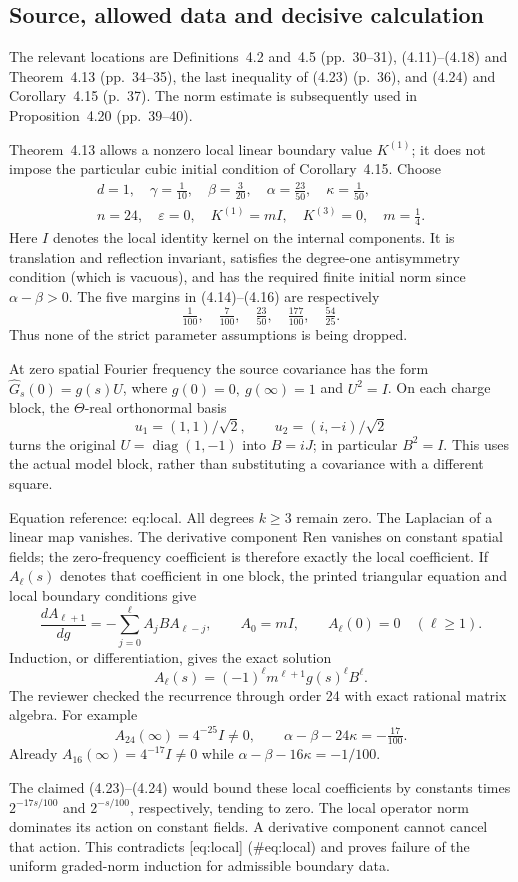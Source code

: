 \documentclass[10pt]{article}
\begin{document}
\subsection*{Source, allowed data and decisive calculation}
The relevant locations are Definitions 4.2 and 4.5 (pp. 30–31), (4.11)–(4.18) and Theorem 4.13 (pp. 34–35), the last inequality of (4.23) (p. 36), and (4.24) and Corollary 4.15 (p. 37). The norm estimate is subsequently used in Proposition 4.20 (pp. 39–40).\par
Theorem 4.13 allows a nonzero local linear boundary value \(K^{(1)}\); it does not impose the particular cubic initial condition of Corollary 4.15. Choose \[\begin{gathered}
 d=1,\quad \gamma=\tfrac1{10},\quad \beta=\tfrac3{20},\quad
 \alpha=\tfrac{23}{50},\quad \kappa=\tfrac1{50},\\
 n=24,\quad \varepsilon=0,\quad K^{(1)}=mI,\quad K^{(3)}=0,
 \quad m=\tfrac14 .
 \end{gathered}\] Here \(I\) denotes the local identity kernel on the internal components. It is translation and reflection invariant, satisfies the degree-one antisymmetry condition (which is vacuous), and has the required finite initial norm since \(\alpha-\beta>0\). The five margins in (4.14)–(4.16) are respectively \[\tfrac1{100},\quad\tfrac7{100},\quad\tfrac{23}{50},
 \quad\tfrac{177}{100},\quad\tfrac{54}{25}.\] Thus none of the strict parameter assumptions is being dropped.\par
At zero spatial Fourier frequency the source covariance has the form \(\widehat G_s(0)=g(s)U\), where \(g(0)=0,\ g(\infty)=1\) and \(U^2=I\). On each charge block, the \(\Theta\)-real orthonormal basis \[u_1=(1,1)/\sqrt2,\qquad u_2=(i,-i)/\sqrt2\] turns the original \(U=\operatorname{diag}(1,-1)\) into \(B=iJ\); in particular \(B^2=I\). This uses the actual model block, rather than substituting a covariance with a different square.\par
Equation reference: eq:local. All degrees \(k\geq3\) remain zero. The Laplacian of a linear map vanishes. The derivative component \(\mathrm{Ren}\) vanishes on constant spatial fields; the zero-frequency coefficient is therefore exactly the local coefficient. If \(A_\ell(s)\) denotes that coefficient in one block, the printed triangular equation and local boundary conditions give \[\frac{d A_{\ell+1}}{dg}
       =-\sum_{j=0}^{\ell}A_jBA_{\ell-j},\qquad
 A_0=mI,\qquad A_\ell(0)=0\quad(\ell\geq1).\] Induction, or differentiation, gives the exact solution \[A_\ell(s)=(-1)^\ell m^{\ell+1}g(s)^\ell B^\ell.   \] The reviewer checked the recurrence through order 24 with exact rational matrix algebra. For example \[A_{24}(\infty)=4^{-25}I\ne0,\qquad
 \alpha-\beta-24\kappa=-\tfrac{17}{100}.\] Already \(A_{16}(\infty)=4^{-17}I\ne0\) while \(\alpha-\beta-16\kappa=-1/100\).\par
The claimed (4.23)–(4.24) would bound these local coefficients by constants times \(2^{-17s/100}\) and \(2^{-s/100}\), respectively, tending to zero. The local operator norm dominates its action on constant fields. A derivative component cannot cancel that action. This contradicts [eq:local] (\#eq:local) and proves failure of the uniform graded-norm induction for admissible boundary data.\par
\end{document}
